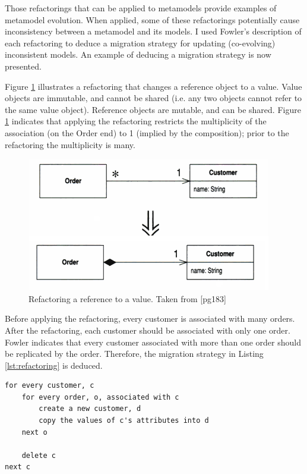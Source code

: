 Those refactorings that can be applied to metamodels provide examples of metamodel evolution. When applied, some of these refactorings potentially cause inconsistency between a metamodel and its models. I used Fowler's description of each refactoring to deduce a migration strategy for updating (co-evolving) inconsistent models. An example of deducing a migration strategy is now presented.

Figure \ref{fig:refactoring} illustrates a refactoring that changes a reference object to a value. Value objects are immutable, and cannot be shared (i.e. any two objects cannot refer to the same value object). Reference objects are mutable, and can be shared. Figure \ref{fig:refactoring} indicates that applying the refactoring restricts the multiplicity of the association (on the Order end) to 1 (implied by the composition); prior to the refactoring the multiplicity is many.

\begin{figure}[htbp]
  \begin{center}
    \leavevmode
    \includegraphics[scale=0.5]{refactoring.png}
  \end{center}
  \caption{Refactoring a reference to a value. Taken from \cite{fowler99refactoring}[pg183]}
  \label{fig:refactoring}
\end{figure}

Before applying the refactoring, every customer is associated with many orders. After the refactoring, each customer should be associated with only one order. Fowler indicates that every customer associated with more than one order should be replicated by the order. Therefore, the migration strategy in Listing \ref{lst:refactoring} is deduced.

\begin{lstlisting}[caption=Migration strategy for the refactoring in pseudo code., label=lst:refactoring]
for every customer, c
	for every order, o, associated with c
		create a new customer, d
		copy the values of c's attributes into d
	next o
	
	delete c
next c
\end{lstlisting}

